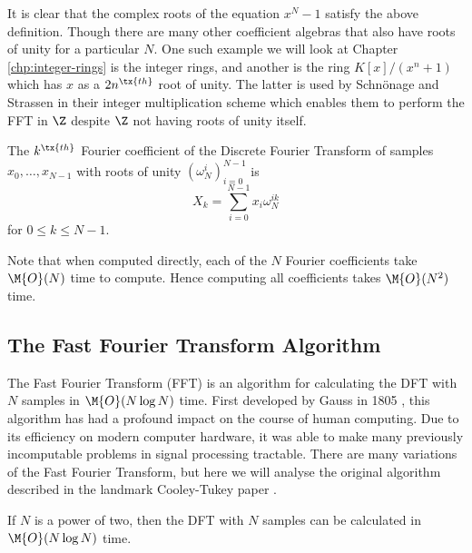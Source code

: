 It is clear that the complex roots of the equation $x^N - 1$ satisfy the above definition. Though there are many other coefficient algebras that also have roots of unity for a particular $N$. One such example we will look at Chapter \ref{chp:integer-rings} is the integer rings, and another is the ring $K[x]/(x^n + 1)$ which has $x$ as a $2n^{\tx{th}}$ root of unity. The latter is used by Schn\"{o}nage and Strassen in their integer multiplication scheme which enables them to perform the FFT in $\Z$ despite $\Z$ not having roots of unity itself.

\begin{definition}
    The $k^{\tx{th}}$ Fourier coefficient of the Discrete Fourier Transform of samples $x_0, \ldots, x_{N-1}$ with roots of unity $(\omega_N^i)_{i=0}^{N-1}$ is
\[
    X_k = \sum^{N-1}_{i=0}x_i\omega_{N}^{ik}
\]
for $0 \leq k \leq N-1$.
\end{definition}

Note that when computed directly, each of the $N$ Fourier coefficients take $\M{O}(N)$ time to compute. Hence computing all coefficients takes $\M{O}(N^2)$ time.


\subsection{The Fast Fourier Transform Algorithm}

The Fast Fourier Transform (FFT) is an algorithm for calculating the DFT with $N$ samples in $\M{O}(N \log N)$ time. First developed by Gauss in 1805 \cite{gauss}, this algorithm has had a profound impact on the course of human computing. Due to its efficiency on modern computer hardware, it was able to make many previously incomputable problems in signal processing tractable.
There are many variations of the Fast Fourier Transform, but here we will analyse the original algorithm described in the landmark Cooley-Tukey paper \cite{fft}.

\begin{theorem}\label{thm:fft}
    If $N$ is a power of two, then the DFT with $N$ samples can be calculated in $\M{O}(N\log N)$ time.
\end{theorem}

